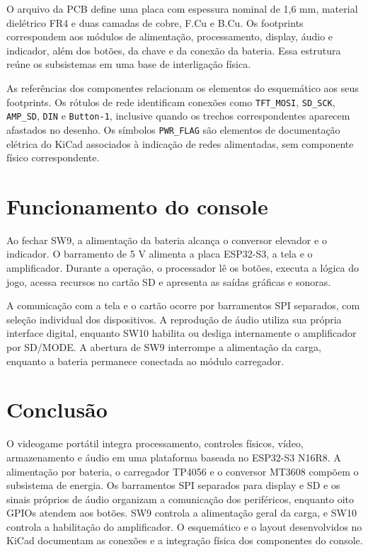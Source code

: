 \documentclass[12pt,a4paper]{article}
\begin{document}
O arquivo da PCB define uma placa com espessura nominal de 1,6 mm, material dielétrico FR4 e duas camadas de cobre, F.Cu e B.Cu. Os footprints correspondem aos módulos de alimentação, processamento, display, áudio e indicador, além dos botões, da chave e da conexão da bateria. Essa estrutura reúne os subsistemas em uma base de interligação física.

As referências dos componentes relacionam os elementos do esquemático aos seus footprints. Os rótulos de rede identificam conexões como \texttt{TFT\_MOSI}, \texttt{SD\_SCK}, \texttt{AMP\_SD}, \texttt{DIN} e \texttt{Button-1}, inclusive quando os trechos correspondentes aparecem afastados no desenho. Os símbolos \texttt{PWR\_FLAG} são elementos de documentação elétrica do KiCad associados à indicação de redes alimentadas, sem componente físico correspondente.

\section{Funcionamento do console}
Ao fechar SW9, a alimentação da bateria alcança o conversor elevador e o indicador. O barramento de 5 V alimenta a placa ESP32-S3, a tela e o amplificador. Durante a operação, o processador lê os botões, executa a lógica do jogo, acessa recursos no cartão SD e apresenta as saídas gráficas e sonoras.

A comunicação com a tela e o cartão ocorre por barramentos SPI separados, com seleção individual dos dispositivos. A reprodução de áudio utiliza sua própria interface digital, enquanto SW10 habilita ou desliga internamente o amplificador por SD/MODE. A abertura de SW9 interrompe a alimentação da carga, enquanto a bateria permanece conectada ao módulo carregador.

\section{Conclusão}
O videogame portátil integra processamento, controles físicos, vídeo, armazenamento e áudio em uma plataforma baseada no ESP32-S3 N16R8. A alimentação por bateria, o carregador TP4056 e o conversor MT3608 compõem o subsistema de energia. Os barramentos SPI separados para display e SD e os sinais próprios de áudio organizam a comunicação dos periféricos, enquanto oito GPIOs atendem aos botões. SW9 controla a alimentação geral da carga, e SW10 controla a habilitação do amplificador. O esquemático e o layout desenvolvidos no KiCad documentam as conexões e a integração física dos componentes do console.
\end{document}
